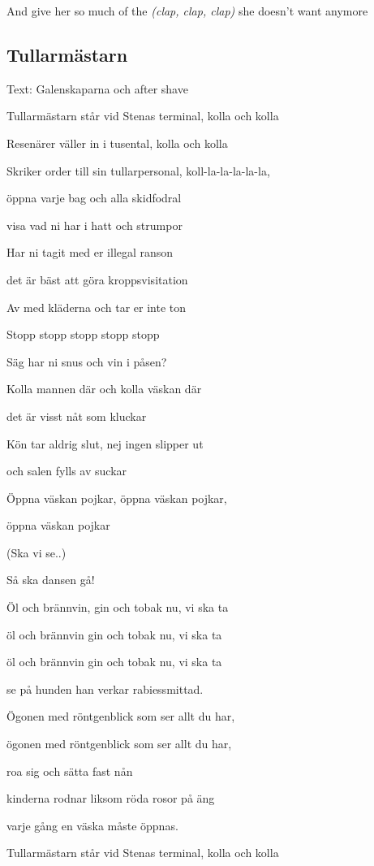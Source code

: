 And give her so much of the \emph{(clap, clap, clap)} she doesn't want anymore \bigskip


\subsection{\textbf{Tullarmästarn}}

Text: Galenskaparna och after shave\bigskip

Tullarmästarn står vid Stenas terminal, kolla och kolla

Resenärer väller in i tusental, kolla och kolla

Skriker order till sin tullarpersonal, koll-la-la-la-la-la,

öppna varje bag och alla skidfodral

visa vad ni har i hatt och strumpor

Har ni tagit med er illegal ranson

det är bäst att göra kroppsvisitation

Av med kläderna och tar er inte ton

Stopp stopp stopp stopp stopp

Säg har ni snus och vin i påsen?

Kolla mannen där och kolla väskan där

det är visst nåt som kluckar

Kön tar aldrig slut, nej ingen slipper ut

och salen fylls av suckar

Öppna väskan pojkar, öppna väskan pojkar,

öppna väskan pojkar

(Ska vi se..)

Så ska dansen gå!\bigskip

Öl och brännvin, gin och tobak nu, vi ska ta

öl och brännvin gin och tobak nu, vi ska ta

öl och brännvin gin och tobak nu, vi ska ta

se på hunden han verkar rabiessmittad.

Ögonen med röntgenblick som ser allt du har,

ögonen med röntgenblick som ser allt du har,

roa sig och sätta fast nån

kinderna rodnar liksom röda rosor på äng

varje gång en väska måste öppnas.\bigskip

Tullarmästarn står vid Stenas terminal, kolla och kolla

